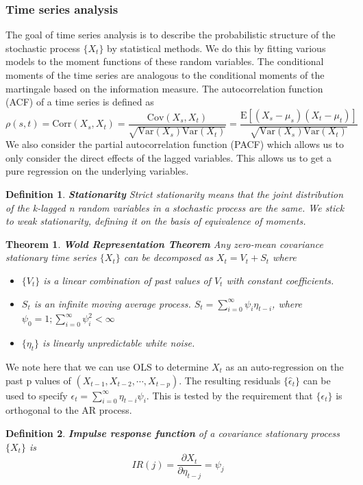 \documentclass[12pt,a4paper]{cibb}
\newtheorem{theorem}{Theorem}[section]
\newtheorem{definition}{Definition}
\begin{document}
\subsubsection{\textbf{Time series analysis}}
The goal of time series analysis is to describe the probabilistic structure of the stochastic process $\{X_t\}$ by statistical methods. We do this by fitting various models to the moment functions of these random variables. The conditional moments of the time series are analogous to the conditional moments of the martingale based on the information measure.
The autocorrelation function (ACF) of a time series is defined as \[\rho(s,t) = \text{Corr}(X
_s, X_t) = \frac{\text{Cov}(X_s, X_t)}{\sqrt{\text{Var}(X_s)\text{Var}(X_t)}}= \frac{\text{E}[(X_s - \mu_s)(X_t - \mu_t)]}{\sqrt{\text{Var}(X_s)\text{Var}(X_t)}}  \]
We also consider the partial autocorrelation function (PACF) which allows us to only consider the direct effects of the lagged variables. This allows us to get a pure regression on the underlying variables. 

\begin{definition}
   \textbf{Stationarity} Strict stationarity means that the joint distribution of the k-lagged n random variables in a stochastic process are the same. We stick to weak stationarity, defining it on the basis of equivalence of moments.  
\end{definition}

\begin{theorem}
    \textbf{Wold Representation Theorem} Any zero-mean covariance stationary time series $\{X_t\}$ can be decomposed as $X_t = V_t + S_t$ where 
    \begin{itemize}
        \itemsep 1px
        \item $\{V_t\}$ is a linear combination of past values of $V_t$ with constant coefficients.
        \item $S_t$ is an infinite moving average process. $S_t = \sum_{i=0}^\infty \psi_i \eta_{t-i}$, where $\psi_0 = 1;  \sum_{i=0}^\infty \psi_i^2 < \infty $
        \item $\{\eta_t\}$ is linearly unpredictable white noise.
    \end{itemize}
\end{theorem}
We note here that we can use OLS to determine $X_t$ as an auto-regression on the past p values of $(X_{t-1}, X_{t-2}, \cdots, X_{t-p})$. The resulting residuals $\{\hat\epsilon_t\}$ can be used to specify $\epsilon_t = \sum_{i=0}^\infty \eta_{t-i}\psi_i$. This is tested by the requirement that $\{\epsilon_t\}$ is orthogonal to the AR process.  
\begin{definition}
        \textbf{Impulse response function} of a covariance stationary process $\{X_t\}$ is \[IR(j) = \frac{\partial{X_t}}{\partial{\eta_{t-j}}} = \psi_j\]
\end{definition}
\end{document}
